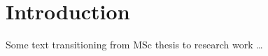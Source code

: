 
\section{Introduction}
\label{Section1}

Some text transitioning from MSc thesis to research work \dots 

\clearpage